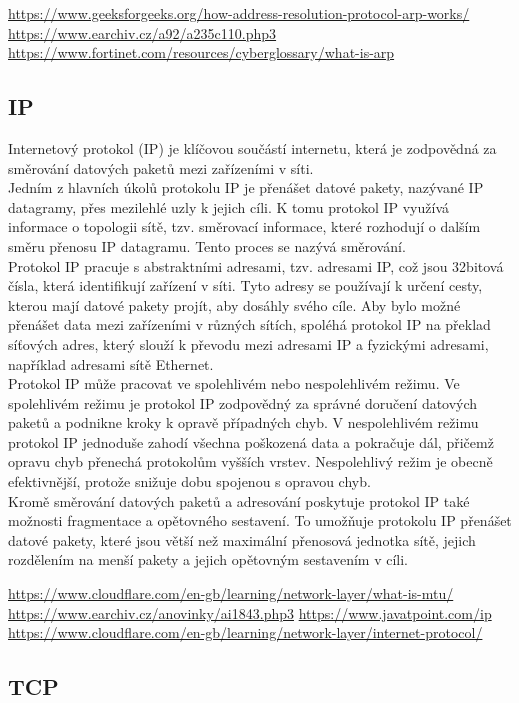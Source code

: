 \documentclass[12pt]{report}			%
\begin{document}
\url{https://www.geeksforgeeks.org/how-address-resolution-protocol-arp-works/}
\url{https://www.earchiv.cz/a92/a235c110.php3}
\url{https://www.fortinet.com/resources/cyberglossary/what-is-arp}

				\subsection{IP}
Internetový protokol (IP) je klíčovou součástí internetu, která je zodpovědná za směrování datových paketů mezi zařízeními v síti.
\\
Jedním z hlavních úkolů protokolu IP je přenášet datové pakety, nazývané IP datagramy, přes mezilehlé uzly k jejich cíli. K tomu protokol IP využívá informace o topologii sítě, tzv. směrovací informace, které rozhodují o dalším směru přenosu IP datagramu. Tento proces se nazývá směrování.
\\
Protokol IP pracuje s abstraktními adresami, tzv. adresami IP, což jsou 32bitová čísla, která identifikují zařízení v síti. Tyto adresy se používají k určení cesty, kterou mají datové pakety projít, aby dosáhly svého cíle. Aby bylo možné přenášet data mezi zařízeními v různých sítích, spoléhá protokol IP na překlad síťových adres, který slouží k převodu mezi adresami IP a fyzickými adresami, například adresami sítě Ethernet.
\\
Protokol IP může pracovat ve spolehlivém nebo nespolehlivém režimu. Ve spolehlivém režimu je protokol IP zodpovědný za správné doručení datových paketů a podnikne kroky k opravě případných chyb. V nespolehlivém režimu protokol IP jednoduše zahodí všechna poškozená data a pokračuje dál, přičemž opravu chyb přenechá protokolům vyšších vrstev. Nespolehlivý režim je obecně efektivnější, protože snižuje dobu spojenou s opravou chyb.
\\
Kromě směrování datových paketů a adresování poskytuje protokol IP také možnosti fragmentace a opětovného sestavení. To umožňuje protokolu IP přenášet datové pakety, které jsou větší než maximální přenosová jednotka sítě, jejich rozdělením na menší pakety a jejich opětovným sestavením v cíli.

\url{https://www.cloudflare.com/en-gb/learning/network-layer/what-is-mtu/}
\url{https://www.earchiv.cz/anovinky/ai1843.php3}
\url{https://www.javatpoint.com/ip}
\url{https://www.cloudflare.com/en-gb/learning/network-layer/internet-protocol/}

				\subsection{TCP}
\end{document}
